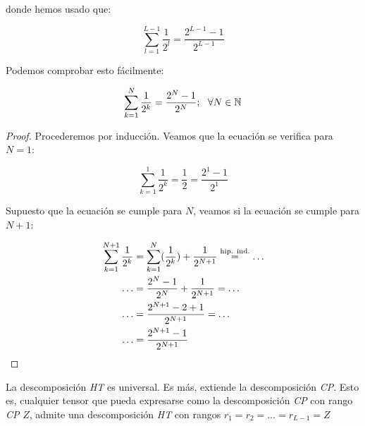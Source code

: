donde hemos usado que:

\begin{equation}
    \sum_{l = 1}^{L-1} \frac{1}{2^l} = \frac{2^{L-1} - 1}{2^{L-1}}
\end{equation}

Podemos comprobar esto fácilmente:

\begin{proposicion}
    \begin{equation}
        \sum_{k = 1}^{N} \frac{1}{2^k} = \frac{2^N - 1}{2^N}; \dspace \forall N \in \N
    \end{equation}
\end{proposicion}

\begin{proof}
    Procederemos por inducción. Veamos que la ecuación se verifica para $N = 1$:

    \begin{equation}
        \sum_{k = 1}^{1} \frac{1}{2^k} = \frac{1}{2} = \frac{2^1 - 1}{2^1}
    \end{equation}

    Supuesto que la ecuación se cumple para $N$, veamos si la ecuación se cumple para $N + 1$:

    \begin{equation}
    \begin{split}
        \sum_{k = 1}^{N+1} \frac{1}{2^k} &= \sum_{k = 1}^{N} (\frac{1}{2^k}) + \frac{1}{2^{N+1}} \encima{=}{\text{hip. ind.}} \ldots \\
        \ldots &= \frac{2^N - 1}{2^N} + \frac{1}{2^{N+1}} = \ldots \\
        \ldots &= \frac{2^{N+1} - 2 + 1}{2^{N+1}} = \ldots \\
        \ldots &= \frac{2^{N+1} - 1}{2^{N+1}}
    \end{split}
    \end{equation}
\end{proof}


\begin{proposicion}

    La descomposición \textit{HT} es universal. Es más, extiende la descomposición \textit{CP}. Esto es, cualquier tensor que pueda expresarse como la descomposición \textit{CP} con rango \textit{CP} $Z$, admite una descomposición \textit{HT} con rangos $r_1 = r_2 = \ldots = r_{L - 1} = Z$
\end{proposicion}

